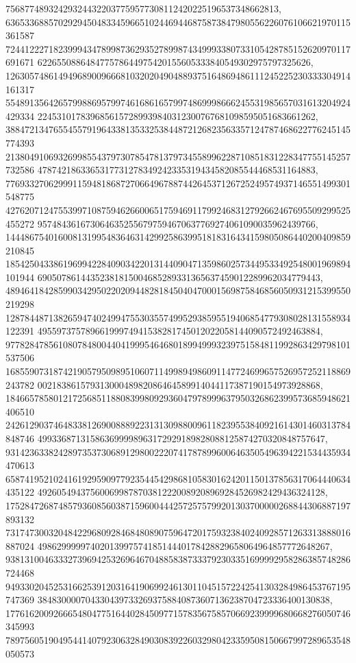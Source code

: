 \documentclass[12pt]{article}
\begin{document}
756877489324293244322037759577308112420225196537348662813, 
636533688570292945048334596651024469446875873847980556226076106621970115361587
724412227182399943478998736293527899874349993380733105428785152620970117691671
622655088648477578644975420155605333840549302975797325626, 
126305748614949689009666810320204904889375164869486111245225230333304914161317
554891356426579988695799746168616579974869998666245531985657031613204924429334
2245310178396856157289939840312300767681098595051683661262, 
388472134765545579196433813533253844872126823563357124787468622776245145774393
213804910693269985543797307854781379734558996228710851831228347755145257732586
4787421863365317731278349242335319434582085544468531164883, 
776933270629991159481868727066496788744264537126725249574937146551499301548775
427620712475539971087594626600651759469117992468312792662467695509299525455272
9574843616730646352556797594670637769274061090035962439766, 
144486754016008131995483646314299258639951818316434159805086440200409859210845
185425043386196994228409034220131440904713598602573449533492548001969894101944
69050786144352381815004685289331365637459012289962034779443, 
489464184285990342950220209448281845040470001569875846856050931215399550219298
128784487138265947402499475530355749952938595519406854779308028131558934122391
49559737578966199974941538281745012022058144090572492463884, 
977828478561080784800440419995464680189949993239751584811992863429798101537506
168559073187421905795098951060711499894986091147724699657526957252118869243782
00218386157931300048982086464589914044117387190154973928868, 
184665785801217256851188083998092936047978999637950326862399573685948621406510
242612903746483381269008889223131309880096118239553840921614301460313784848746
499336871315863699998963172929189828088125874270320848757647, 
931423633824289735373068912980022207417878996006463505496394221534435934470613
658741952102416192959097792354454298681058301624201150137856317064440634435122
492605494375600699878703812220089208969284526982429436324128, 
175284726874857936085603871596004442572575799201303700000268844306887197893132
731747300320484229680928468480890759647201759323840240928571263313888016887024
4986299999740201399757418514440178428829658064964857772648267, 
938131004633327396942532696467048858387333792303351699992958286385748286724468
949330204525316625391203164190699246130110451572242541303284986453767195747369
3848300007043304397332693758840873607136238704723336400130838, 
177616200926665480477516440284509771578356758570669239999680668276050746345993
789756051904954414079230632849030839226032980423359508150667997289653548050573
\end{document}
